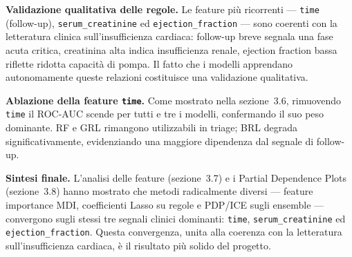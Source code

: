 \documentclass[a4paper,11pt]{article}
\begin{document}
\textbf{Validazione qualitativa delle regole.}
Le feature più ricorrenti --- \texttt{time} (follow-up), \texttt{serum\_creatinine} ed
\texttt{ejection\_fraction} --- sono coerenti con la letteratura clinica sull'insufficienza
cardiaca: follow-up breve segnala una fase acuta critica, creatinina alta indica insufficienza
renale, ejection fraction bassa riflette ridotta capacità di pompa. Il fatto che i modelli
apprendano autonomamente queste relazioni costituisce una validazione qualitativa.

\textbf{Ablazione della feature \texttt{time}.}
Come mostrato nella sezione~3.6, rimuovendo \texttt{time} il ROC-AUC scende per tutti e tre
i modelli, confermando il suo peso dominante. RF e GRL rimangono utilizzabili in triage;
BRL degrada significativamente, evidenziando una maggiore dipendenza dal segnale di follow-up.

\textbf{Sintesi finale.}
L'analisi delle feature (sezione~3.7) e i Partial Dependence Plots (sezione~3.8) hanno
mostrato che metodi radicalmente diversi --- feature importance MDI, coefficienti Lasso su
regole e PDP/ICE sugli ensemble --- convergono sugli stessi tre segnali clinici dominanti:
\texttt{time}, \texttt{serum\_creatinine} ed \texttt{ejection\_fraction}. Questa
convergenza, unita alla coerenza con la letteratura sull'insufficienza cardiaca, è il
risultato più solido del progetto.
\end{document}
